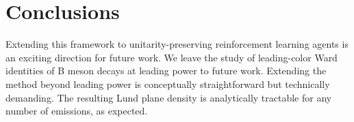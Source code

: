 \section{Conclusions}\label{sec:conclusions}

Extending this framework to unitarity-preserving reinforcement learning
agents is an exciting direction for future work. We leave the study of
leading-color Ward identities of B meson decays at leading power to
future work. Extending the method beyond leading power is conceptually
straightforward but technically demanding. The resulting Lund plane
density is analytically tractable for any number of emissions, as
expected.

